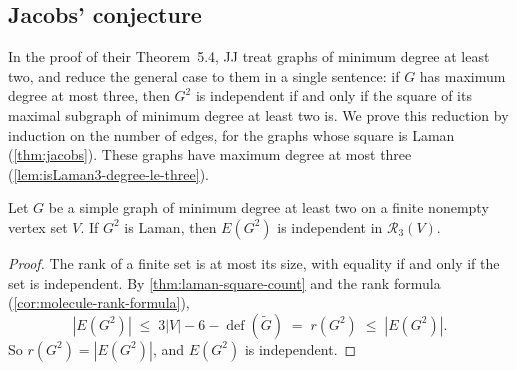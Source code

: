 \subsection{Jacobs' conjecture}
\label{sec:jacobs-theorem}

In the proof of their Theorem~5.4, JJ treat graphs of minimum degree
at least two, and reduce the general case to them in a single sentence:
if $G$ has maximum degree at most three, then $G^2$ is independent if
and only if the square of its maximal subgraph of minimum degree at
least two is. We prove this reduction by induction on the number of
edges, for the graphs whose square is Laman (\cref{thm:jacobs}). These
graphs have maximum degree at most three
(\cref{lem:isLaman3-degree-le-three}).

\begin{theorem}
  \label{thm:jacobs-min-degree-two}
  \leanok
  Let $G$ be a simple graph of minimum degree at least two on a finite
  nonempty vertex set $V$. If $G^2$ is Laman, then $E(G^2)$ is
  independent in $\mathcal{R}_3(V)$.
\end{theorem}
\begin{proof}
  \leanok
  The rank of a finite set is at most its size, with equality if and
  only if the set is independent. By \cref{thm:laman-square-count} and
  the rank formula (\cref{cor:molecule-rank-formula}),
  \[
    |E(G^2)| \;\le\; 3|V| - 6 - \operatorname{def}(\tilde G)
    \;=\; r(G^2) \;\le\; |E(G^2)|.
  \]
  So $r(G^2) = |E(G^2)|$, and $E(G^2)$ is independent.
\end{proof}

